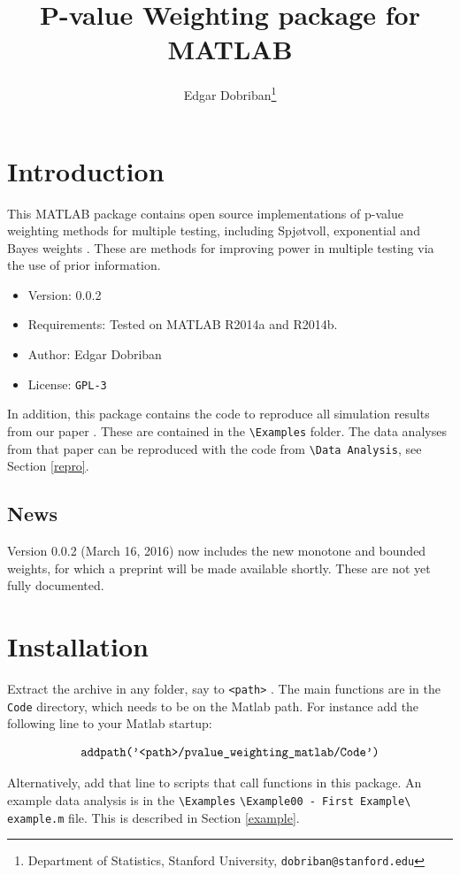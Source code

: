 \documentclass[english,11pt]{article} %
\title{P-value Weighting package for MATLAB}
\author{Edgar Dobriban\thanks{Department of Statistics, Stanford University, \texttt{dobriban@stanford.edu}} }
\begin{document}
\maketitle
\tableofcontents
\section{Introduction}

This MATLAB package contains open source implementations of p-value weighting methods for multiple testing, including Spj\o tvoll, exponential and Bayes weights \citep[proposed in][]{dobriban2015optimal}. These are methods for improving power in multiple testing via the use of prior information.  

\begin{itemize}
\item{Version: } 0.0.2
\item{Requirements: } Tested on MATLAB R2014a and R2014b. 
\item{Author: } Edgar Dobriban
\item{License: } \verb+GPL-3+
\end{itemize}

In addition, this package contains the code to reproduce all simulation results from our paper \cite{dobriban2015optimal}. These are contained in the \verb+\Examples+ folder. The data analyses from that paper can be reproduced with the code from \verb+\Data Analysis+, see Section \ref{repro}. 

\subsection{News}

Version 0.0.2 (March 16, 2016) now includes the new monotone and bounded weights, for which a preprint will be made available shortly. These are not yet fully documented. 

\section{Installation}

Extract the archive in any folder, say to \verb+<path>+ . The main functions are in the \verb+Code+ directory, which needs to be on the Matlab path. For instance add the following line to your Matlab startup:

$$\verb+addpath('<path>/pvalue_weighting_matlab/Code')+$$

Alternatively,  add that line to scripts that call functions in this package. An example data analysis is in the \verb+\Examples+ \verb+\Example00 - First Example\+ \verb+example.m+ file. This is described in Section \ref{example}.
\end{document}
